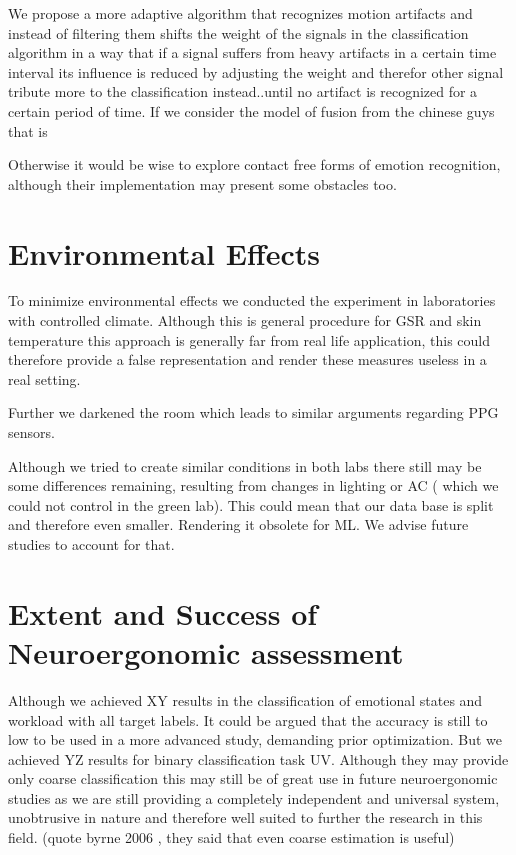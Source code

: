 We propose a more adaptive algorithm that recognizes motion artifacts and instead of filtering them shifts the weight of the signals in the classification algorithm in a way that if a signal suffers from heavy artifacts in a certain time interval its influence is reduced by adjusting the weight and therefor other signal tribute more to the classification instead..until no artifact is recognized for a certain period of time. If we consider the model of fusion from the chinese guys that is

Otherwise it would be wise to explore contact free forms of emotion recognition, although their implementation may present some obstacles too.

\section{Environmental Effects}
To minimize environmental effects we conducted the experiment in laboratories with controlled climate. Although this is general procedure for GSR and skin temperature this approach is generally far from real life application, this could therefore provide a false representation and render these measures useless in a real setting.

Further we darkened the room which leads to similar arguments regarding PPG sensors.

Although we tried to create similar conditions in both labs there still may be some differences remaining, resulting from changes in lighting or AC ( which we could not control in the green lab). This could mean that our data base is split and therefore even smaller. Rendering it obsolete for ML. We advise future studies to account for that.

\section{Extent and Success of Neuroergonomic assessment}
Although we achieved XY results in the classification of emotional states and workload with all target labels. It could be argued that the accuracy is still to low to be used in a more advanced study, demanding prior optimization.
But we achieved YZ results for binary classification task UV. Although they may provide only coarse classification this may still be of great use in future neuroergonomic studies as we are still providing a completely independent and universal system, unobtrusive in nature and therefore well suited to further the research in this field. (quote byrne 2006 , they said that even coarse estimation is useful)
